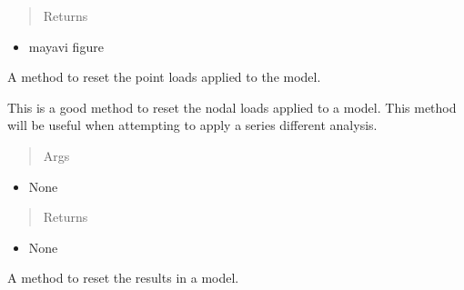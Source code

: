 \documentclass[letterpaper,10pt,english]{sphinxmanual}
\begin{document}
\begin{fulllineitems}
\begin{fulllineitems}
\begin{itemize}
\begin{description}
\end{description}

\end{itemize}
\begin{quote}\begin{description}
\item[{Returns}] \leavevmode
\end{description}\end{quote}
\begin{itemize}
\item {} 
mayavi figure

\end{itemize}

\end{fulllineitems}


\begin{fulllineitems}
\label{FEM:AeroComBAT.FEM.Model.resetPointLoads}
A method to reset the point loads applied to the model.

This is a good method to reset the nodal loads applied to a model. This
method will be useful when attempting to apply a series different
analysis.
\begin{quote}\begin{description}
\item[{Args}] \leavevmode
\end{description}\end{quote}
\begin{itemize}
\item {} 
None

\end{itemize}
\begin{quote}\begin{description}
\item[{Returns}] \leavevmode
\end{description}\end{quote}
\begin{itemize}
\item {} 
None

\end{itemize}

\end{fulllineitems}


\begin{fulllineitems}
\label{FEM:AeroComBAT.FEM.Model.resetResults}
A method to reset the results in a model.


\end{fulllineitems}
\end{fulllineitems}
\end{document}
